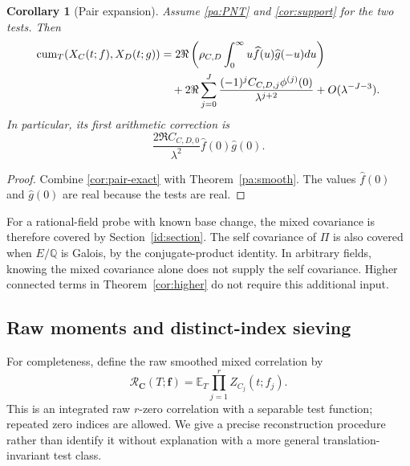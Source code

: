 \documentclass[11pt,reqno]{amsart}
\numberwithin{equation}{section}
\newtheorem{corollary}[theorem]{Corollary}
\theoremstyle{definition}
\theoremstyle{remark}
\begin{document}
\begin{corollary}[Pair expansion]\label{cor:pair}
Assume \eqref{pa:PNT} and \eqref{cor:support} for the two tests. Then
\begin{align}
\operatorname{cum}_T(X_C(t;f),X_D(t;g))
&=2\Re\left(\rho_{C,D}\int_0^\infty u\widehat f(u)\widehat g(-u)du\right)\notag\\
&\quad+2\Re\sum_{j=0}^{J}
\frac{(-1)^j C_{C,D,j}\phi^{(j)}(0)}{\lambda^{j+2}}
+O(\lambda^{-J-3}).\label{cor:pair-expansion}
\end{align}
In particular, its first arithmetic correction is
\begin{equation}\frac{2\Re C_{C,D,0}}{\lambda^2}\widehat f(0)\widehat g(0).\label{cor:pair-first}
\end{equation}
\end{corollary}
\begin{proof}
Combine \eqref{cor:pair-exact} with Theorem~\ref{pa:smooth}. The values $\widehat f(0)$ and $\widehat g(0)$ are real because the tests are real.
\end{proof}

For a rational-field probe with known base change, the mixed covariance is therefore covered by Section~\ref{id:section}. The self covariance of $\Pi$ is also covered when $E/\mathbb Q$ is Galois, by the conjugate-product identity. In arbitrary fields, knowing the mixed covariance alone does not supply the self covariance. Higher connected terms in Theorem~\ref{cor:higher} do not require this additional input.

\subsection{Raw moments and distinct-index sieving}
For completeness, define the raw smoothed mixed correlation by
\begin{equation}\mathcal R_{\boldsymbol C}(T;\boldsymbol f)
=\mathbb E_T\prod_{j=1}^r Z_{C_j}(t;f_j).\label{cor:raw}
\end{equation}
This is an integrated raw $r$-zero correlation with a separable test function; repeated zero indices are allowed. We give a precise reconstruction procedure rather than identify it without explanation with a more general translation-invariant test class.
\end{document}
